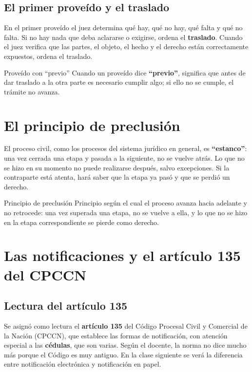 \documentclass[12pt,oneside]{book}
\begin{document}
\subsection{El primer proveído y el traslado}

En el primer proveído el juez determina qué hay, qué no hay, qué falta y qué no falta. Si no hay nada que deba aclararse o exigirse, ordena el \textbf{traslado}. Cuando el juez verifica que las partes, el objeto, el hecho y el derecho están correctamente expuestos, ordena el traslado.

\begin{definition}{Proveído con ``previo''}
Cuando un proveído dice \textbf{``previo''}, significa que antes de dar traslado a la otra parte es necesario cumplir algo; si ello no se cumple, el trámite no avanza.
\end{definition}

\section{El principio de preclusión}

El proceso civil, como los procesos del sistema jurídico en general, es \textbf{``estanco''}: una vez cerrada una etapa y pasada a la siguiente, no se vuelve atrás. Lo que no se hizo en su momento no puede realizarse después, salvo excepciones. Si la contraparte está atenta, hará saber que la etapa ya pasó y que se perdió un derecho.

\begin{definition}{Principio de preclusión}
Principio según el cual el proceso avanza hacia adelante y no retrocede: una vez superada una etapa, no se vuelve a ella, y lo que no se hizo en la etapa correspondiente se pierde como derecho.
\end{definition}


\section{Las notificaciones y el artículo 135 del CPCCN}

\subsection{Lectura del artículo 135}

Se asignó como lectura el \textbf{artículo 135} del Código Procesal Civil y Comercial de la Nación (CPCCN), que establece las formas de notificación, con atención especial a las \textbf{cédulas}, que son varias. Según el docente, la norma no dice mucho más porque el Código es muy antiguo. En la clase siguiente se verá la diferencia entre notificación electrónica y notificación en papel.
\end{document}

